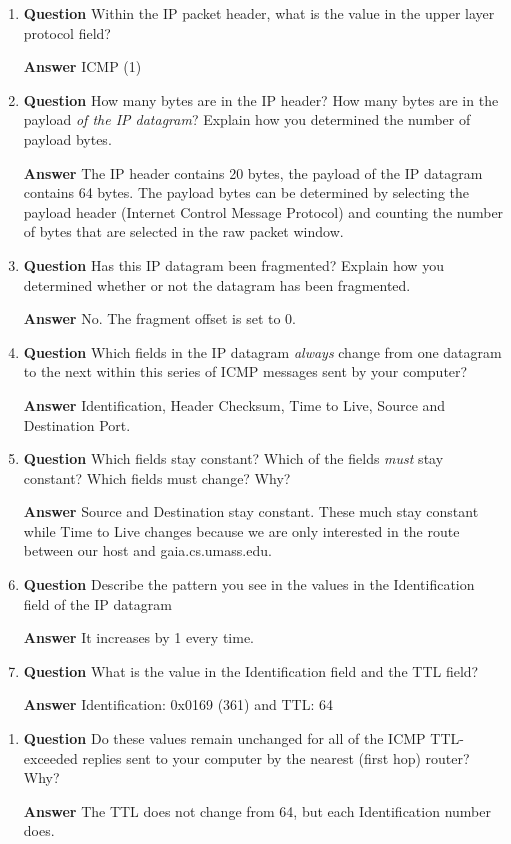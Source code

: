 \documentclass[12pt,letterpaper]{article}
\newcommand{\q}{\textbf{Question} }
\newcommand{\ans}{\textbf{Answer} }
\begin{document}
\begin{enumerate}[resume]
\item \q Within the IP packet header, what is the value in the
upper layer protocol field?

\ans ICMP (1)

\item \q How many bytes are in the IP header? 
How many bytes are in the payload \emph{of the IP datagram}?
Explain how you determined the number of payload bytes.

\ans The IP header contains 20 bytes, the payload of the IP
datagram contains 64 bytes.
The payload bytes can be determined by selecting the payload
header (Internet Control Message Protocol) and counting the number of bytes
that are selected in the raw packet window.

\item \q Has this IP datagram been fragmented? Explain how you 
determined whether or not the datagram has been fragmented.

\ans No. The fragment offset is set to 0.

\item \q Which fields in the IP datagram \emph{always} change from
one datagram to the next within this series of ICMP messages sent by your
computer? 

\ans Identification, Header Checksum, Time to Live, Source and
Destination Port.

\item \q Which fields stay constant? Which of the fields \emph{must} stay constant? Which fields
must change? Why?

\ans Source and Destination stay constant. These much stay
constant while Time to Live changes because we are only interested in the route
between our host and gaia.cs.umass.edu.

\item \q Describe the pattern you see in the values in the
Identification field of the IP datagram

\ans It increases by 1 every time.

\pagebreak
\item \q What is the value in the Identification field and the TTL
field?

\ans Identification: 0x0169 (361) and TTL: 64
\end{enumerate}



\begin{enumerate}[resume]
\item \q Do these values remain unchanged for all of the ICMP
TTL-exceeded replies sent to your computer by the nearest (first hop) router?
Why?

\ans The TTL does not change from 64, but each Identification
number does.
\end{enumerate}
\end{document}
